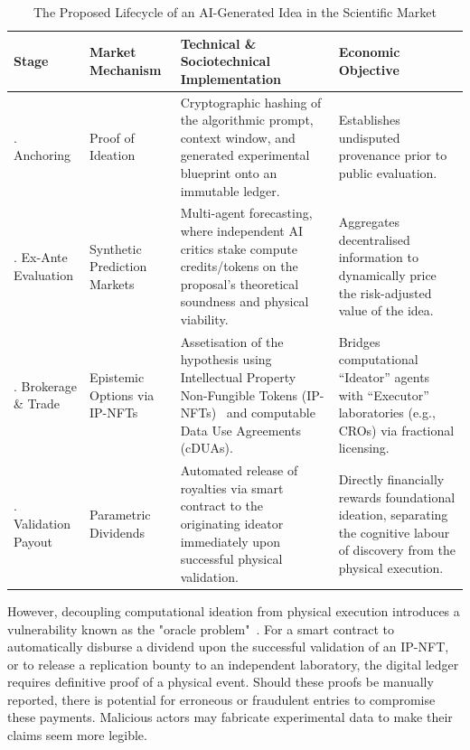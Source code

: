 \documentclass[11pt, a4paper, twocolumn, goog]{google}
\begin{document}
\begin{table}[htbp]
\centering
\caption{The Proposed Lifecycle of an AI-Generated Idea in the Scientific Market}
\label{tab:ideamarket}
\renewcommand{\arraystretch}{1.5}
\begin{tabular}{@{} >{\raggedright\arraybackslash}p{2.5cm} >{\raggedright\arraybackslash}p{3cm} >{\raggedright\arraybackslash}p{5cm} >{\raggedright\arraybackslash}p{5cm} @{}}
\toprule
\textbf{Stage} & \textbf{Market Mechanism} & \textbf{Technical \& Sociotechnical Implementation} & \textbf{Economic Objective} \\
\midrule
1. Anchoring & Proof of Ideation & Cryptographic hashing of the algorithmic prompt, context window, and generated experimental blueprint onto an immutable ledger. & Establishes undisputed provenance prior to public evaluation. \\
2. Ex-Ante Evaluation & Synthetic Prediction Markets & Multi-agent forecasting, where independent AI critics stake compute credits/tokens on the proposal's theoretical soundness and physical viability. & Aggregates decentralised information to dynamically price the risk-adjusted value of the idea. \\
3. Brokerage \& Trade & Epistemic Options via IP-NFTs & Assetisation of the hypothesis using Intellectual Property Non-Fungible Tokens (IP-NFTs)~\citep{ortlepp_ipnft_v2_2022} and computable Data Use Agreements (cDUAs). & Bridges computational ``Ideator'' agents with ``Executor'' laboratories (e.g., CROs) via fractional licensing. \\
4. Validation Payout & Parametric Dividends & Automated release of royalties via smart contract to the originating ideator immediately upon successful physical validation. & Directly financially rewards foundational ideation, separating the cognitive labour of discovery from the physical execution. \\
\bottomrule
\end{tabular}
\end{table}

However, decoupling computational ideation from physical execution introduces a vulnerability known as the "oracle problem"~\citep{caldarelli2020understanding}. For a smart contract to automatically disburse a dividend upon the successful validation of an IP-NFT, or to release a replication bounty to an independent laboratory, the digital ledger requires definitive proof of a physical event. Should these proofs be manually reported, there is potential for erroneous or fraudulent entries to compromise these payments. Malicious actors may fabricate experimental data to make their claims seem more legible.
\end{document}
